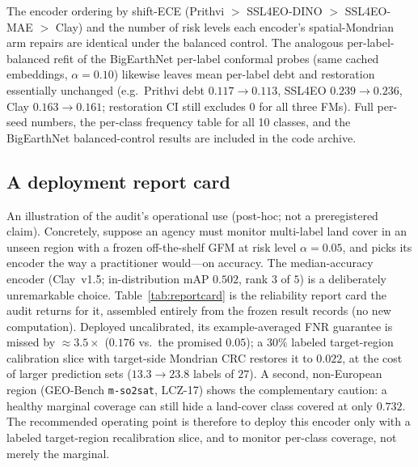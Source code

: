 \documentclass[journal]{IEEEtran}
\renewcommand{\_}{\textunderscore\allowbreak}
\begin{document}
\noindent The encoder ordering by shift-ECE (Prithvi $>$ SSL4EO-DINO $>$ SSL4EO-MAE $>$ Clay) and the
number of risk levels each encoder's spatial-Mondrian arm repairs are identical under the balanced
control. The analogous per-label-balanced refit of the BigEarthNet per-label conformal probes
(same cached embeddings, $\alpha=0.10$) likewise leaves mean per-label debt and restoration
essentially unchanged (e.g.\ Prithvi debt $0.117\to0.113$, SSL4EO $0.239\to0.236$, Clay
$0.163\to0.161$; restoration CI still excludes $0$ for all three FMs). Full per-seed numbers,
the per-class frequency table for all 10 classes, and the BigEarthNet balanced-control results are
included in the code archive.

\subsection{A deployment report card}\label{sec:reportcard}
An illustration of the audit's operational use (post-hoc; not a preregistered claim). Concretely,
suppose an agency must monitor multi-label land cover in an unseen region with a frozen off-the-shelf GFM
at risk level $\alpha{=}0.05$, and picks its encoder the way a practitioner would---on accuracy. The
median-accuracy encoder (Clay~v1.5; in-distribution mAP $0.502$, rank $3$ of $5$) is a deliberately
unremarkable choice. Table~\ref{tab:reportcard} is the reliability report card the audit returns for it,
assembled entirely from the frozen result records (no new computation). Deployed uncalibrated, its
example-averaged FNR guarantee is missed by ${\approx}3.5\times$ ($0.176$ vs.\ the promised $0.05$); a
$30\%$ labeled target-region calibration slice with target-side Mondrian CRC restores it to $0.022$,
at the cost of larger prediction sets ($13.3\to23.8$ labels of $27$). A second, non-European region
(GEO-Bench \texttt{m-so2sat}, LCZ-17) shows the complementary caution: a healthy marginal coverage can
still hide a land-cover class covered at only $0.732$. The recommended operating point is therefore to
deploy this encoder only with a labeled target-region recalibration slice, and to monitor per-class
coverage, not merely the marginal.
\end{document}
